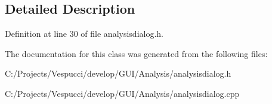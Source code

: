 \subsection{Detailed Description}


Definition at line 30 of file analysisdialog.\+h.



The documentation for this class was generated from the following files\+:\begin{DoxyCompactItemize}
\item 
C\+:/\+Projects/\+Vespucci/develop/\+G\+U\+I/\+Analysis/analysisdialog.\+h\item 
C\+:/\+Projects/\+Vespucci/develop/\+G\+U\+I/\+Analysis/analysisdialog.\+cpp\end{DoxyCompactItemize}
